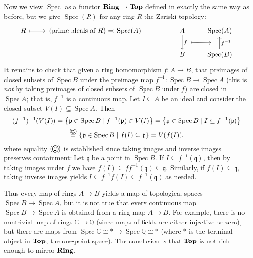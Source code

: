 \documentclass[11pt,leqno]{article}
\theoremstyle{plain}
\theoremstyle{definition}
\numberwithin{equation}{section}
\numberwithin{lem}{section}
\newcommand{\cbr}[1]{\left\{#1\right\}}
\newcommand{\eq}[1]{\overset{(#1)}{=}}
\DeclareMathOperator{\Spec}{Spec}
\newcommand{\catname}[1]{{\normalfont\mathbf{#1}}}
\newcommand{\Ring}{\catname{Ring}}
\newcommand{\Top}{\catname{Top}}
\newcommand{\smallhappy}{\raisebox{-.14em}{\smiley}}
\newcommand{\happy}{\raisebox{-.24em}{\resizebox{1.2em}{!}{\smiley}}}
\DeclareMathOperator{\mathhappy}{\!\happy\!}
\DeclareMathOperator{\smallmathhappy}{\!\smallhappy\!}
\begin{document}
Now we view $\Spec$ as a functor $\Ring \to \Top$ defined in exactly the same way as before, but we give $\Spec(R)$ for any ring $R$ the Zariski topology:
\begin{equation}
  \begin{tikzcd}[ampersand replacement=\&]
    R \& {\cbr{\text{prime ideals of }R}\eqqcolon \Spec(A)} \&\& A \& {\Spec(A)} \\
    \&\&\& B \& {\Spec(B)}
    \arrow[maps to, from=1-1, to=1-2]
    \arrow[""{name=0, anchor=center, inner sep=0}, "f", from=1-4, to=2-4]
    \arrow[""{name=1, anchor=center, inner sep=0}, "{f^{-1}}"', from=2-5, to=1-5]
    \arrow[shorten <=12pt, shorten >=12pt, maps to, from=0, to=1]
  \end{tikzcd}
\end{equation}
It remains to check that given a ring homomorphism $f\colon A\to B$, that preimages of closed subsets of $\Spec B$ under the preimage map $f^{-1}\colon \Spec B\to\Spec A$ (this is \textit{not} by taking preimages of closed subsets of $\Spec B$ under $f$) are closed in $\Spec A$; that is, $f^{-1}$ is a continuous map.
Let $I\subseteq A$ be an ideal and consider the closed subset $V(I)\subseteq\Spec A$. Then
\begin{multline}
  (f^{-1})^{-1}(V(I)) = \cbr{\mathfrak p\in\Spec B\mid f^{-1}(\mathfrak p)\in V(I)} = \cbr{\mathfrak p\in \Spec B\mid I\subseteq f^{-1}(\mathfrak p)}\\ \eq{\smallmathhappy} \cbr{\mathfrak p\in\Spec B\mid f(I)\subseteq \mathfrak p} = V(f(I)),
\end{multline}
where equality $(\mathhappy)$ is established since taking images and inverse images preserves containment: Let $\mathfrak q$ be a point in $\Spec B$. If $I\subseteq f^{-1}(\mathfrak q)$, then by taking images under $f$ we have $f(I)\subseteq ff^{-1}(\mathfrak q) \subseteq \mathfrak q$. Similarly, if $f(I)\subseteq \mathfrak q$, taking inverse images yields $I\subseteq f^{-1}f(I)\subseteq f^{-1}(\mathfrak q)$ as needed.

Thus every map of rings $A\to B$ yields a map of topological spaces $\Spec B\to\Spec A$, but it is not true that every continuous map $\Spec B\to\Spec A$ is obtained from a ring map $A\to B$. For example, there is no nontrivial map of rings $\mathbb C\to\mathbb Q$ (since maps of fields are either injective or zero), but there are maps from $\Spec \mathbb C \cong \ast \to\Spec \mathbb Q \cong \ast$ (where $\ast$ is the terminal object in $\Top$, the one-point space). The conclusion is that $\Top$ is not rich enough to mirror $\Ring$.
\end{document}
